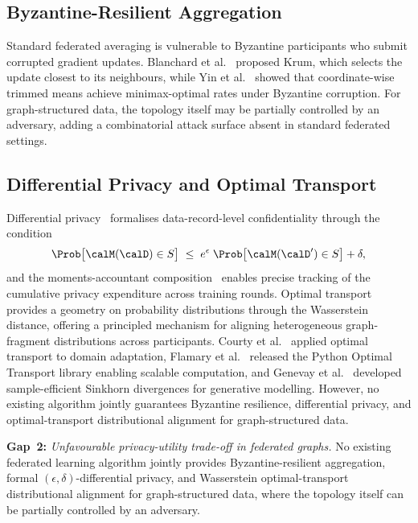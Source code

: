 \subsection{Byzantine-Resilient Aggregation}

Standard federated averaging is vulnerable to Byzantine participants who submit corrupted gradient updates. Blanchard et al.~\cite{Blanchard2017} proposed Krum, which selects the update closest to its neighbours, while Yin et al.~\cite{Yin2018} showed that coordinate-wise trimmed means achieve minimax-optimal rates under Byzantine corruption. For graph-structured data, the topology itself may be partially controlled by an adversary, adding a combinatorial attack surface absent in standard federated settings.


\subsection{Differential Privacy and Optimal Transport}

Differential privacy~\cite{Dwork2006} formalises data-record-level confidentiality through the condition
\begin{equation}
\Prob\bigl[\calM(\calD)\in S\bigr]
\;\le\;
e^{\epsilon}\;\Prob\bigl[\calM(\calD')\in S\bigr] + \delta,
\end{equation}
and the moments-accountant composition~\cite{Abadi2016} enables precise tracking of the cumulative privacy expenditure across training rounds. Optimal transport~\cite{Villani2009,Cuturi2013} provides a geometry on probability distributions through the Wasserstein distance, offering a principled mechanism for aligning heterogeneous graph-fragment distributions across participants. Courty et al.~\cite{Courty2017} applied optimal transport to domain adaptation, Flamary et al.~\cite{Flamary2021pot} released the Python Optimal Transport library enabling scalable computation, and Genevay et al.~\cite{Genevay2018} developed sample-efficient Sinkhorn divergences for generative modelling. However, no existing algorithm jointly guarantees Byzantine resilience, differential privacy, and optimal-transport distributional alignment for graph-structured data.

\medskip
\noindent\textbf{Gap~2:} \emph{Unfavourable privacy-utility trade-off in federated graphs.} No existing federated learning algorithm jointly provides Byzantine-resilient aggregation, formal $(\epsilon,\delta)$-differential privacy, and Wasserstein optimal-transport distributional alignment for graph-structured data, where the topology itself can be partially controlled by an adversary.

